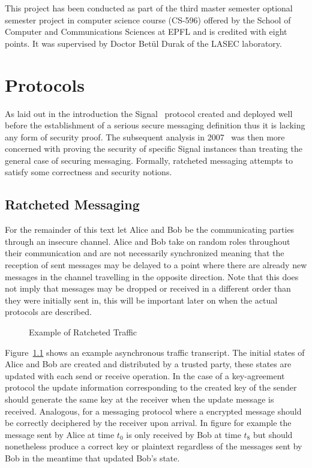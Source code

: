 \documentclass[11pt,a4paper,twoside,openright,bibliography=totoc]{scrbook}
\begin{document}
This project has been conducted as part of the third master semester optional
semester project in computer science course (CS-596) offered by the
School of Computer and Communications Sciences at EPFL and is credited
with eight points. It was supervised by Doctor Betül Durak of
the LASEC laboratory.

\chapter{Protocols}
\label{chap:protocols}

As laid out in the introduction the Signal~\cite{perrin2016double}
protocol created and deployed well before the establishment of a
serious secure messaging definition thus it is lacking any form of
security proof. The subsequent analysis in 2007~\cite{cohn2017formal}
was then more concerned with proving the security of specific Signal
instances than treating the general case of securing
messaging. Formally, ratcheted messaging attempts to satisfy some
correctness and security notions.


\section{Ratcheted Messaging}
\label{sec:ratcheted-messaging}

For the remainder of this text let Alice and Bob be the communicating
parties through an insecure channel. Alice and Bob take on random
roles throughout their communication and are not necessarily
synchronized meaning that the reception of sent messages may be
delayed to a point where there are already new messages in the channel
travelling in the opposite direction. Note that this does not imply
that messages may be dropped or received in a different order than
they were initially sent in, this will be important later on when
the actual protocols are described.
\begin{figure}[ht]
  \centering
   
  \caption{Example of Ratcheted Traffic}
  \label{fig:traffic}
\end{figure}
Figure~\ref{fig:traffic}
shows an example asynchronous traffic transcript. The initial states
of Alice and Bob are created and distributed by a trusted party, these
states are updated with each send or receive operation. In the case
of a key-agreement protocol the update information corresponding to
the created key of the sender should generate the same key at
the receiver when the update message is received. Analogous,
for a messaging protocol where a encrypted message should be
correctly deciphered by the receiver upon arrival. In figure
for example the message sent by Alice at time $t_0$ is only
received by Bob at time $t_8$ but should nonetheless produce
a correct key or plaintext regardless of the messages sent
by Bob in the meantime that updated Bob's state.
\end{document}
